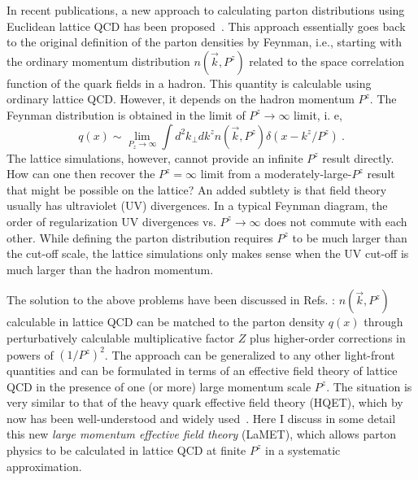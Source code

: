 In recent publications, a new approach to calculating parton distributions using Euclidean
lattice QCD has been proposed~\cite{Ji:2013fga, Ji:2013dva, Xiong:2013bka,Hatta:2013gta,Lin:2014zya}.
This approach essentially goes back to the original definition
of the parton densities by Feynman, i.e., starting with the ordinary momentum distribution $n(\vec{k}, P^z)$
related to the space correlation function of the quark fields in a hadron. This quantity
is calculable using ordinary lattice QCD. However,  it depends
on the hadron momentum $P^z$. The Feynman distribution is obtained in the limit of
$P^z\rightarrow \infty$ limit, i. e,
\begin{equation}
                q(x) \sim \lim_{P_z\rightarrow\infty} \int d^2k_\perp dk^z n(\vec{k},P^z)\delta (x-k^z/P^z) \ .
\end{equation}
The lattice simulations, however, cannot provide an infinite $P^z$ result directly.
How can one then recover the $P^z=\infty$ limit from a moderately-large-$P^z$ result that might
be possible on the lattice?  An added subtlety is that field theory usually has ultraviolet (UV) divergences.
In a typical Feynman diagram, the order of regularization UV divergences vs. $P^z\rightarrow \infty$ does not
commute with each other. While defining the parton distribution requires $P^z$ to be much larger than the cut-off scale,
the lattice simulations only makes sense when the UV cut-off is much larger than the hadron momentum.

The solution to the above problems have been discussed in Refs. \cite{Ji:2013dva}: $n(\vec{k}, P^z)$
calculable in lattice QCD can be matched to the parton density $q(x)$ through perturbatively calculable
multiplicative factor $Z$ plus higher-order corrections in powers of $(1/P^z)^2$.
The approach can be generalized to any other light-front quantities and can be formulated in terms of
an effective field theory of lattice QCD in the presence of one (or more) large momentum scale $P^z$.
The situation is very similar to that of the heavy quark effective field theory (HQET), which by now
has been well-understood and widely used~\cite{Manohar:2000dt}.  Here I discuss in some detail
this new {\it large momentum effective field theory} (LaMET),  which allows parton physics to be calculated
in lattice QCD at finite $P^z$ in a systematic approximation.

